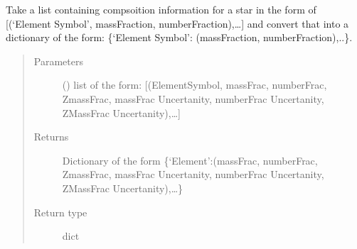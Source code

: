 \documentclass[letterpaper,10pt,english]{sphinxmanual}
\begin{document}

\begin{fulllineitems}
\label{\detokenize{pyTOPSScrape.api:pyTOPSScrape.api.convert.comp_list_2_dict}}
\sphinxAtStartPar
Take a list containing compsoition information for a star in the form of
{[}(‘Element Symbol’, massFraction, numberFraction),…{]} and convert that
into a dictionary of the form:
\{‘Element Symbol’: (massFraction, numberFraction),..\}.
\begin{quote}\begin{description}
\item[{Parameters}] \leavevmode
\sphinxAtStartPar
{} () \textendash{} list of the form: {[}(ElementSymbol, massFrac, numberFrac, ZmassFrac,
massFrac Uncertanity, numberFrac Uncertanity, ZMassFrac
Uncertanity),…{]}

\item[{Returns}] \leavevmode
\sphinxAtStartPar
Dictionary of the form \{‘Element’:(massFrac, numberFrac, ZmassFrac,
massFrac Uncertanity, numberFrac Uncertanity, ZMassFrac
Uncertanity),…\}

\item[{Return type}] \leavevmode
\sphinxAtStartPar
dict

\end{description}\end{quote}

\end{fulllineitems}

\end{document}
